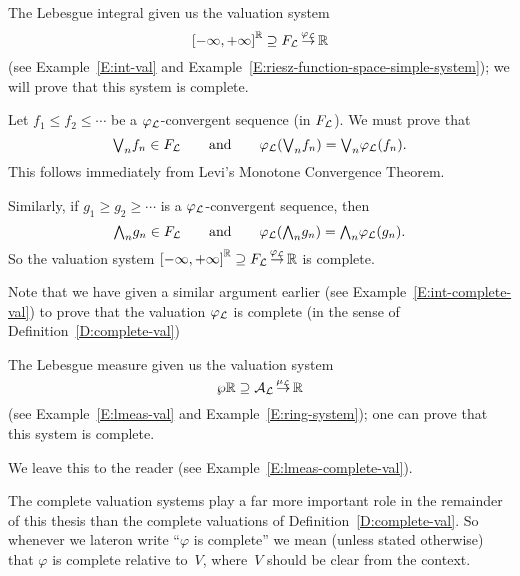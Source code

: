 \documentclass[main.tex]{subfiles}
\begin{document}
\begin{ex}
\label{E:complete-lint}
The Lebesgue integral
given us the   valuation system
\begin{equation*}
{[-\infty,+\infty]}^{\mathbb{R}} \supseteq F_{\mathcal{L}}\,\smash{\stackrel{\varphi_{\mathcal{L}}}{\rightarrow}}\,\mathbb{R}
\end{equation*}
(see Example~\ref{E:int-val} and
Example~\ref{E:riesz-function-space-simple-system});
we will prove that this system is complete.

Let $f_1 \leq f_2 \leq \dotsb$
be a $\varphi_{\mathcal{L}}$-convergent sequence (in $F_{\mathcal{L}}$).
We must prove that 
\begin{equation*}
\textstyle{\bigvee}_n f_n \in F_{\mathcal{L}}
\qquad\text{and}\qquad\varphi_{\mathcal{L}}(\textstyle{\bigvee}_n f_n) = \textstyle{\bigvee}_n \varphi_{\mathcal{L}} (f_n).
\end{equation*}
This follows immediately from Levi's Monotone Convergence Theorem.

Similarly,
if $g_1 \geq g_2 \geq \dotsb$
is a $\varphi_{\mathcal{L}}$-convergent sequence,
then
\begin{equation*}
\textstyle{\bigwedge}_n g_n \in F_{\mathcal{L}}
\qquad\text{and}\qquad\varphi_{\mathcal{L}}(\textstyle{\bigwedge}_n g_n) = \textstyle{\bigwedge}_n \varphi_{\mathcal{L}} (g_n).
\end{equation*}
So the  valuation system ${[-\infty,+\infty]}^{\mathbb{R}} \supseteq F_{\mathcal{L}}\,\smash{\stackrel{\varphi_{\mathcal{L}}}{\rightarrow}}\,\mathbb{R}$ is complete.

Note that we have given a similar argument earlier 
(see Example~\ref{E:int-complete-val}) to prove
that the valuation $\varphi_{\mathcal{L}}$
is complete (in the sense of Definition~\ref{D:complete-val})
\end{ex}
%
%
\begin{ex}
\label{E:complete-lmeas}
The Lebesgue measure
given us the   valuation system
\begin{equation*}
\wp{\mathbb{R}} \supseteq \mathcal{A}_{\mathcal{L}}\,\smash{\stackrel{\mu_{\mathcal{L}}}{\rightarrow}}\,\mathbb{R}
\end{equation*}
(see Example~\ref{E:lmeas-val} and
Example~\ref{E:ring-system});
one can prove that this system is complete.

We leave this to the reader (see Example~\ref{E:lmeas-complete-val}).
\end{ex}
%
%
%
The complete valuation systems play a far more important
role in the remainder of this thesis
than the complete valuations of Definition~\ref{D:complete-val}.
So whenever we lateron write ``$\varphi$ is complete'' 
we mean (unless stated otherwise) that  $\varphi$ is complete relative to~$V$,
where~$V$ should be clear from the context.
\end{document}
